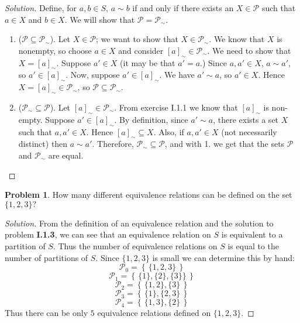 \documentclass[fontsize=14pt]{scrartcl}
\theoremstyle{definition}
\newtheorem{problem-internal}{Problem}[subsection]
\newenvironment{problem}{
  \medskip
  \begin{problem-internal}
}{
  \end{problem-internal}
}
\newenvironment{solution}{
  \begin{proof}[Solution]
  \vspace{-8px}
  \setlength{\parskip}{4px}
  \setlength{\parindent}{0px}
}{
  \end{proof}
}
\newcommand{\set}[1]{\left\{\,#1\,\right\}}
\begin{document}
\begin{solution}
Define, for $a,b\in S$, $a\sim b$ if and only if there exists
an $X\in\mathscr{P}$ such that $a\in X$ and $b\in X$. We will show that
$\mathscr{P} = \mathscr{P}_{\sim}$. 

\begin{enumerate}
\item ($\mathscr{P}\subseteq\mathscr{P}_{\sim}$). Let $X\in \mathscr{P}$; we want to
show that $X\in\mathscr{P}_{\sim}$. We know that $X$ is
nonempty, so choose $a\in X$ and consider $[a]_{\sim}\in\mathscr{P}_{\sim}$. We
need to show that $X=[a]_{\sim}$. Suppose $a'\in X$ (it may be that $a'=a$.)
Since $a,a'\in X$, $a\sim a'$, so $a'\in[a]_{\sim}$. Now, suppose $a'\in
[a]_{\sim}$. We have $a'\sim a$, so $a'\in X$. Hence $X=[a]_{\sim}\in
\mathscr{P}_{\sim}$, so $\mathscr{P}\subseteq\mathscr{P}_{\sim}$.

\item ($\mathscr{P}_{\sim}\subseteq\mathscr{P}$). Let $[a]_{\sim}\in\mathscr{P}_{\sim}$.
From exercise I.1.1 we know that $[a]_{\sim}$ is non-empty. Suppose
$a'\in[a]_{\sim}$. By definition, since $a'\sim a$, there exists a set $X$ such
that $a,a'\in X$. Hence $[a]_{\sim}\subseteq X$. Also, if $a,a'\in X$ (not
necessarily distinct) then $a\sim a'$. Therefore,
$\mathscr{P}_{\sim}\subseteq\mathscr{P}$, and with 1. we get that the sets
$\mathscr{P}$ and $\mathscr{P}_{\sim}$ are equal.
\end{enumerate}
\end{solution}


\begin{problem}
How many different equivalence relations can be defined on the set $\{1,2,3\}?$
\end{problem}

\begin{solution}
From the definition of an equivalence relation and the solution to problem
\textbf{I.1.3}, we can see that an equivalence relation on $S$ is equivalent to
a partition of $S$. Thus the number of equivalence relations on $S$ is equal to
the number of partitions of $S$. Since $\{1,2,3\}$ is small we can determine
this by hand:
%
\[ \mathscr{P}_0 = \set{\{1,2,3\}} \]
\[ \mathscr{P}_1 = \set{\{1\},\{2\},\{3\}\}} \]
\[ \mathscr{P}_2 = \set{\{1,2\},\{3\}} \]
\[ \mathscr{P}_3 = \set{\{1\},\{2,3\}} \]
\[ \mathscr{P}_4 = \set{\{1,3\},\{2\}} \]
%
Thus there can be only $5$ equivalence relations defined on $\{1,2,3\}$.
\end{solution}
\end{document}
